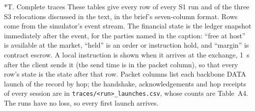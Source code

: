 \documentclass[10pt,letterpaper]{article}
\makeatletter
\renewcommand\section{\@startsection{section}{1}{\z@}{-9pt plus -2pt minus -1pt}{3pt}{\normalfont\large\bfseries}}
\makeatother
\begin{document}
\section*{T. Complete traces}
These tables give every row of every S1 run and of the three S3 relocations discussed in the text, in the brief's
seven-column format. Rows come from the simulator's event stream. The financial state is the ledger snapshot
immediately after the event, for the parties named in the caption: ``free at host'' is available at the market,
``held'' is an order or instruction hold, and ``margin'' is contract escrow. A local instruction is shown when it
arrives at the exchange, 1~s after the client sends it (the send time is in the packet column), so that every row's
state is the state after that row. Packet columns list each backbone DATA launch of the record by hop; the
handshake, acknowledgements and hop receipts of every session are in \texttt{traces/<run>\_launches.csv}, whose
counts are Table~A4. The runs have no loss, so every first launch arrives.
\end{document}
